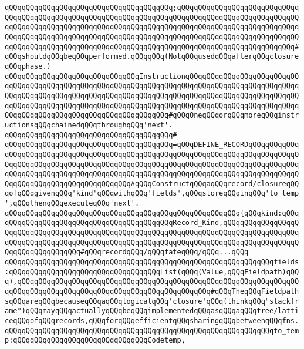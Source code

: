\verb|qQQqqQQqqQQqqQQqqQQqqQQqqQQqqQQqqQQqqQQq;qQQqqQQqqQQqqQQqqQQqqQQqqQQqqQQqqQQqqQQqqQQqqQQqqQQqqQQqqQQqqQQqqQQqqQQqqQQqqQQqqQQqqQQqqQQqqQQqqQQqqQQqqQQqqQQqqQQqqQQqqQQqqQQqqQQqqQQqqQQqqQQqqQQqqQQqqQQqqQQqqQQqqQQqqQQqqQQqqQQqqQQqqQQqqQQqqQQqqQQqqQQqqQQqqQQqqQQqqQQqqQQqqQQqqQQqqQQqqQQqqQQqqQQqqQQqqQQqqQQqqQQqqQQqqQQqqQQqqQQqqQQqqQQqqQQqqQQqqQQqqQQqqQQq#qQQqshouldqQQqbeqQQqperformed.qQQqqQQq(NotqQQqusedqQQqafterqQQqclosureqQQqphase.)|\newline
\newline
\verb|qQQqqQQqqQQqqQQqqQQqqQQqqQQqqQQqInstructionqQQqqQQqqQQqqQQqqQQqqQQqqQQqqQQqqQQqqQQqqQQqqQQqqQQqqQQqqQQqqQQqqQQqqQQqqQQqqQQqqQQqqQQqqQQqqQQqqQQqqQQqqQQqqQQqqQQqqQQqqQQqqQQqqQQqqQQqqQQqqQQqqQQqqQQqqQQqqQQqqQQqqQQqqQQqqQQqqQQqqQQqqQQqqQQqqQQqqQQqqQQqqQQqqQQqqQQqqQQqqQQqqQQqqQQqqQQqqQQqqQQqqQQqqQQqqQQqqQQqqQQqqQQqqQQqqQQq#qQQqOneqQQqorqQQqmoreqQQqinstructionsqQQqchainedqQQqthroughqQQq'next'.|\newline
\verb|qQQqqQQqqQQqqQQqqQQqqQQqqQQqqQQqqQQqqQQq#|\newline
\verb|qQQqqQQqqQQqqQQqqQQqqQQqqQQqqQQqqQQqqQQq=qQQqDEFINE_RECORDqQQqqQQqqQQqqQQqqQQqqQQqqQQqqQQqqQQqqQQqqQQqqQQqqQQqqQQqqQQqqQQqqQQqqQQqqQQqqQQqqQQqqQQqqQQqqQQqqQQqqQQqqQQqqQQqqQQqqQQqqQQqqQQqqQQqqQQqqQQqqQQqqQQqqQQqqQQqqQQqqQQqqQQqqQQqqQQqqQQqqQQqqQQqqQQqqQQqqQQqqQQqqQQqqQQqqQQqqQQqqQQqqQQqqQQqqQQqqQQqqQQqqQQqqQQq#qQQqConstructqQQqaqQQqrecord/closureqQQqofqQQqgivenqQQq'kind'qQQqwithqQQq'fields',qQQqstoreqQQqinqQQq'to_temp',qQQqthenqQQqexecuteqQQq'next'.|\newline
\verb|qQQqqQQqqQQqqQQqqQQqqQQqqQQqqQQqqQQqqQQqqQQqqQQqqQQqqQQq{qQQqkind:qQQqqQQqqQQqqQQqqQQqqQQqqQQqqQQqqQQqqQQqqQQqRecord_Kind,qQQqqQQqqQQqqQQqqQQqqQQqqQQqqQQqqQQqqQQqqQQqqQQqqQQqqQQqqQQqqQQqqQQqqQQqqQQqqQQqqQQqqQQqqQQqqQQqqQQqqQQqqQQqqQQqqQQqqQQqqQQqqQQqqQQqqQQqqQQqqQQqqQQqqQQqqQQqqQQqqQQqqQQqqQQqqQQq#qQQqrecordqQQq/qQQqfateqQQq/qQQq...qQQq|\newline
\verb|qQQqqQQqqQQqqQQqqQQqqQQqqQQqqQQqqQQqqQQqqQQqqQQqqQQqqQQqqQQqqQQqfields:qQQqqQQqqQQqqQQqqQQqqQQqqQQqqQQqqQQqList(qQQq(Value,qQQqFieldpath)qQQq),qQQqqQQqqQQqqQQqqQQqqQQqqQQqqQQqqQQqqQQqqQQqqQQqqQQqqQQqqQQqqQQqqQQqqQQqqQQqqQQqqQQqqQQqqQQqqQQqqQQqqQQqqQQqqQQqqQQq#qQQqTheqQQqFieldpathsqQQqareqQQqbecauseqQQqaqQQqlogicalqQQq'closure'qQQq(thinkqQQq"stackframe")qQQqmayqQQqactuallyqQQqbeqQQqimplementedqQQqasqQQqaqQQqtree/latticeqQQqofqQQqrecords,qQQqforqQQqefficientqQQqsharingqQQqbetweenqQQqfns.|\newline
\verb|qQQqqQQqqQQqqQQqqQQqqQQqqQQqqQQqqQQqqQQqqQQqqQQqqQQqqQQqqQQqqQQqto_temp:qQQqqQQqqQQqqQQqqQQqqQQqqQQqqQQqCodetemp,|\newline
